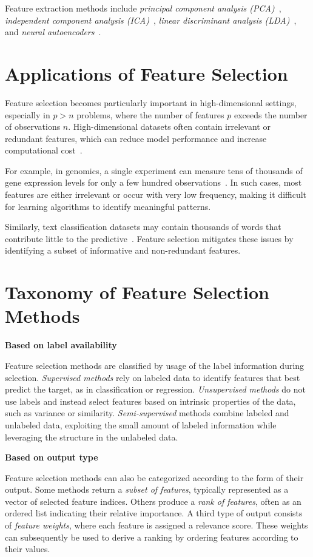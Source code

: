 Feature extraction methods include \emph{principal component analysis (PCA)}~\cite{jolliffe2002}, \emph{independent component analysis (ICA)}~\cite{hyvarinen2001}, \emph{linear discriminant analysis (LDA)}~\cite{bishop2006}, and \emph{neural autoencoders}~\cite{hinton2006}.

\section{Applications of Feature Selection}
Feature selection becomes particularly important in high-dimensional settings, especially in $p > n$ problems, where the number of features $p$ exceeds the number of observations $n$. High-dimensional datasets often contain irrelevant or redundant features, which can reduce model performance and increase computational cost~\cite{guyon2006}. 

For example, in genomics, a single experiment can measure tens of thousands of gene expression levels for only a few hundred observations~\cite{golub1999}. In such cases, most features are either irrelevant or occur with very low frequency, making it difficult for learning algorithms to identify meaningful patterns. 

Similarly, text classification datasets may contain thousands of words that contribute little to the predictive~\cite{forman2003}. Feature selection mitigates these issues by identifying a subset of informative and non-redundant features.

\section{Taxonomy of Feature Selection Methods}
\textbf{Based on label availability} 

Feature selection methods are classified by usage of the label information during selection. \emph{Supervised methods} rely on labeled data to identify features that best predict the target, as in classification or regression. \emph{Unsupervised methods} do not use labels and instead select features based on intrinsic properties of the data, such as variance or similarity. \emph{Semi-supervised} methods combine labeled and unlabeled data, exploiting the small amount of labeled information while leveraging the structure in the unlabeled data. 

\textbf{Based on output type} 

Feature selection methods can also be categorized according to the form of their output. Some methods return a \emph{subset of features}, typically represented as a vector of selected feature indices. Others produce a \emph{rank of features}, often as an ordered list indicating their relative importance. A third type of output consists of \emph{feature weights}, where each feature is assigned a relevance score. These weights can subsequently be used to derive a ranking by ordering features according to their values.

